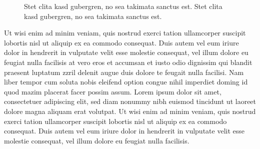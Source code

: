\begin{figure}
    \hfill%
    \caption{Stet clita kasd gubergren, no sea takimata sanctus est. Stet clita kasd gubergren, no sea takimata sanctus est.}
\end{figure}

Ut wisi enim ad minim veniam, quis nostrud exerci tation ullamcorper suscipit lobortis nisl ut aliquip ex ea commodo consequat. Duis autem vel eum iriure dolor in hendrerit in vulputate velit esse molestie consequat, vel illum dolore eu feugiat nulla facilisis at vero eros et accumsan et iusto odio dignissim qui blandit praesent luptatum zzril delenit augue duis dolore te feugait nulla facilisi.
Nam liber tempor cum soluta nobis eleifend option congue nihil imperdiet doming id quod mazim placerat facer possim assum. Lorem ipsum dolor sit amet, consectetuer adipiscing elit, sed diam nonummy nibh euismod tincidunt ut laoreet dolore magna aliquam erat volutpat. Ut wisi enim ad minim veniam, quis nostrud exerci tation ullamcorper suscipit lobortis nisl ut aliquip ex ea commodo consequat.
Duis autem vel eum iriure dolor in hendrerit in vulputate velit esse molestie consequat, vel illum dolore eu feugiat nulla facilisis.
